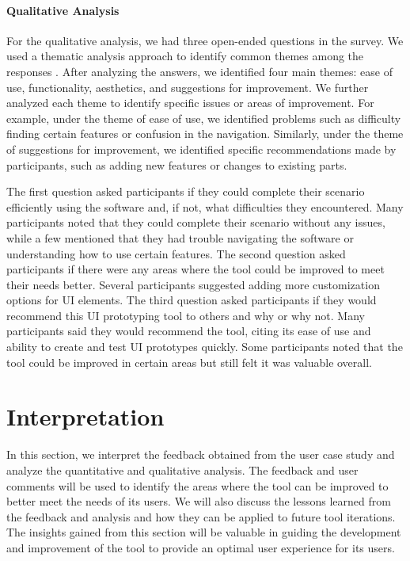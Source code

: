 \paragraph{Qualitative Analysis}
For the qualitative analysis, we had three open-ended questions in the survey. 
We used a thematic analysis approach to identify common themes among the responses \cite{misc:qualitative:thematic}. 
After analyzing the answers, we identified four main themes: ease of use, functionality, aesthetics, and suggestions for improvement.
We further analyzed each theme to identify specific issues or areas of improvement. 
For example, under the theme of ease of use, we identified problems such as difficulty finding certain features or confusion in the navigation. 
Similarly, under the theme of suggestions for improvement, we identified specific recommendations made by participants, such as adding new features or changes to existing parts.

The first question asked participants if they could complete their scenario efficiently using the software and, if not, what difficulties they encountered. 
Many participants noted that they could complete their scenario without any issues, while a few mentioned that they had trouble navigating the software or understanding how to use certain features.
The second question asked participants if there were any areas where the tool could be improved to meet their needs better. 
Several participants suggested adding more customization options for UI elements.
The third question asked participants if they would recommend this UI prototyping tool to others and why or why not. 
Many participants said they would recommend the tool, citing its ease of use and ability to create and test UI prototypes quickly. 
Some participants noted that the tool could be improved in certain areas but still felt it was valuable overall.


\clearpage
\section{Interpretation}
\label{evaluation:section:interpretation}
In this section, we interpret the feedback obtained from the user case study and analyze the quantitative and qualitative analysis. 
The feedback and user comments will be used to identify the areas where the tool can be improved to better meet the needs of its users. 
We will also discuss the lessons learned from the feedback and analysis and how they can be applied to future tool iterations. 
The insights gained from this section will be valuable in guiding the development and improvement of the tool to provide an optimal user experience for its users.

